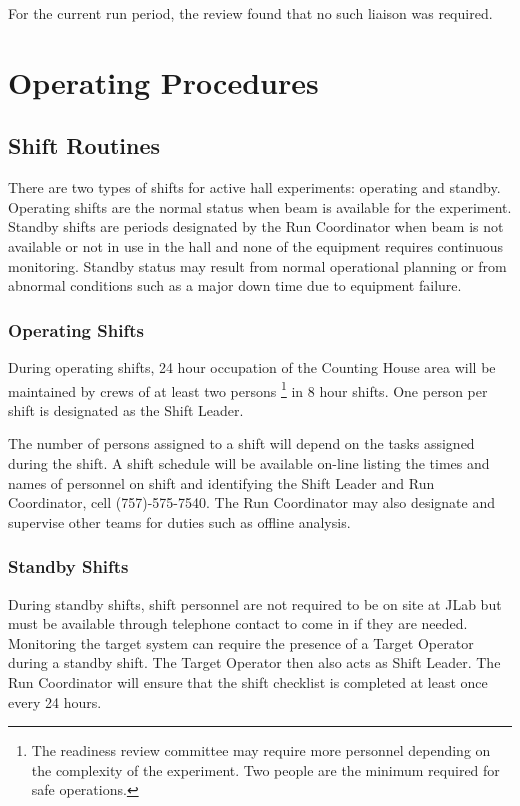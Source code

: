 \documentclass[11pt]{article}
\begin{document}
For the current run period, the review found that no such liaison was required. 

\section{Operating Procedures}

\subsection{Shift Routines}
\indent

There are two types of shifts for active hall experiments:
operating and standby. Operating shifts are the normal status
when beam is available for the experiment. Standby shifts are periods 
designated by the Run Coordinator when beam is not available or not in
use in the hall and none of the equipment requires
continuous monitoring. Standby status may result from normal operational
planning or from abnormal conditions such as a major down time due to
equipment failure.


\subsubsection{Operating Shifts}
\indent

During operating shifts, 24 hour occupation of the Counting House area will 
be maintained by crews of at least two persons
\footnote{\label{fn2}The readiness review committee may require more 
personnel depending on the complexity of the experiment. Two people are 
the minimum required for safe operations.} 
in 8 hour shifts. One person per shift is designated as the Shift Leader.

The number of persons assigned to a shift will depend on the tasks assigned 
during the shift. A shift schedule will be available on-line listing the times
and names of personnel on shift and identifying the Shift Leader and Run Coordinator,
cell (757)-575-7540. The Run Coordinator may also designate and supervise other teams
for duties such as offline analysis.

\subsubsection{Standby Shifts}
\indent

During standby shifts, shift personnel are not required to be on site at 
JLab but must be available through telephone contact to come in if they
are needed.  Monitoring the target system can require the presence of a
Target Operator during a standby shift.  The Target Operator then also
acts as Shift Leader.  The Run Coordinator will ensure that the shift
checklist is completed at least once every 24 hours.
\end{document}
